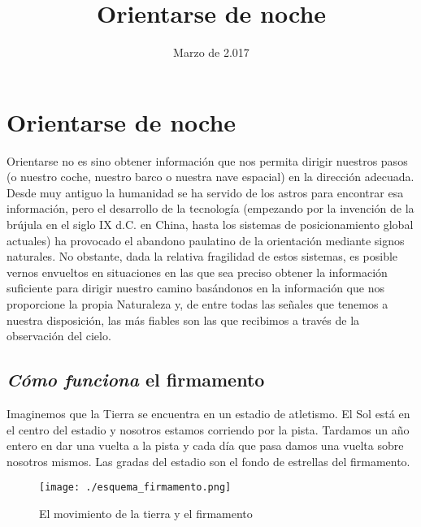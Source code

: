 \documentclass[11pt,a5paper,twoside]{amsbook}
\title{Orientarse de noche}
\date{Marzo de 2.017}
\begin{document}
\titulo

\tableofcontents

\cleardoublepage

\chapter*{Orientarse de noche}
\begin{sumario}[Introducción]
Orientarse no es sino obtener información que nos permita dirigir nuestros pasos (o nuestro coche, nuestro barco o nuestra nave espacial) en la dirección adecuada. Desde muy antiguo la humanidad se ha servido de los astros para encontrar esa información, pero el desarrollo de la tecnología (empezando por la invención de la brújula en el siglo IX d.C. en China, hasta los sistemas de posicionamiento global actuales) ha provocado el abandono paulatino de la orientación mediante signos naturales. No obstante, dada la relativa fragilidad de estos sistemas, es posible vernos envueltos en situaciones en las que sea preciso obtener la información suficiente para dirigir nuestro camino basándonos en la información que nos proporcione la propia Naturaleza y, de entre todas las señales que tenemos a nuestra disposición, las más fiables son las que recibimos a través de la observación del cielo.
\end{sumario}

\section{\textit{Cómo funciona} el firmamento}

Imaginemos que la Tierra se encuentra en un estadio de atletismo. El Sol está en el centro del estadio y nosotros estamos corriendo por la pista. Tardamos un año entero en dar una vuelta a la pista y cada día que pasa damos una vuelta sobre nosotros mismos. Las gradas del estadio son el fondo de estrellas del firmamento. 


\begin{figure}[ht]
 \centering
 \texttt{[image: ./esquema\_firmamento.png]}
 \caption{El movimiento de la tierra y el firmamento}
 \label{carrera_tierra}
\end{figure}
\end{document}
